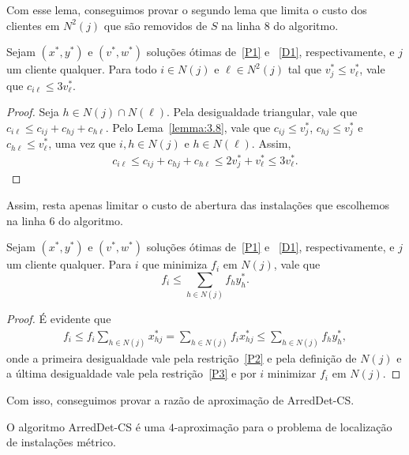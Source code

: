 Com esse lema, conseguimos provar o segundo lema que limita o custo dos clientes em $N^2(j)$ que são removidos de $S$ na linha 8 do algoritmo.

\begin{lemma}\label{lemma:3.9}
    Sejam $(x^*,y^*)$ e $(v^*,w^*)$ soluções ótimas de~\eqref{P1} e ~\eqref{D1}, respectivamente, e $j$ um cliente qualquer. Para todo $i \in N(j)$ e $\ell \in N^2(j)$ tal que $v_j^* \leq v_\ell^* $, vale que $c_{i\ell} \leq 3v^*_\ell$.
\end{lemma}

\begin{proof}
    Seja $h \in N(j) \cap N(\ell)$. Pela desigualdade triangular, vale que ${c_{i\ell} \leq c_{ij} + c_{hj} + c_{h\ell}}$. Pelo Lema~\ref{lemma:3.8}, vale que $c_{ij} \leq v_j^*$, $c_{hj} \leq v_j^*$ e $c_{h\ell} \leq v_\ell^*$, uma vez que $i,h \in N(j)$ e $h \in N(\ell)$. Assim,
    \begin{align}
        c_{i\ell} \leq c_{ij} + c_{hj} + c_{h\ell} \leq 2 v_j^* + v_\ell^* \leq 3 v_\ell^*. \nonumber
    \end{align}
\end{proof}

Assim, resta apenas limitar o custo de abertura das instalações que escolhemos na linha 6 do algoritmo.

\begin{lemma} \label{lemma:3.10}
    Sejam $(x^*,y^*)$ e $(v^*,w^*)$ soluções ótimas de~\eqref{P1} e ~\eqref{D1}, respectivamente, e $j$ um cliente qualquer. Para $i$ que minimiza $f_i$ em $N(j)$, vale que 
    \begin{equation}
        f_i \leq \sum_{h \in N(j)} f_h y_h^*. \nonumber
    \end{equation}
\end{lemma}

\begin{proof}
    É evidente que 
    \begin{align}
        f_{i} \leq f_{i} \sum_{h \in N(j)}x^*_{hj} = \sum_{h \in N(j)}f_{i}x^*_{hj} \leq \sum_{h \in N(j)}f_{h}y^*_{h}, \nonumber
    \end{align}
    onde a primeira desigualdade vale pela restrição~\eqref{P2} e pela definição de $N(j)$ e a última desigualdade vale pela restrição~\eqref{P3} e por $i$ minimizar $f_i$ em $N(j)$.
\end{proof}

Com isso, conseguimos provar a razão de aproximação de {\sc ArredDet-CS}.
\begin{theorem}
    O algoritmo {\sc ArredDet-CS} é uma $4$-aproximação para o problema de localização de instalações métrico.
\end{theorem}

